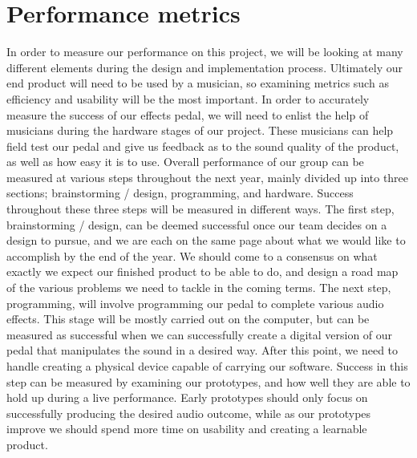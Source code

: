 \documentclass{article}
\begin{document}
\section{Performance metrics}
In order to measure our performance on this project, we will be looking at many different elements during the design and implementation process. Ultimately our end product will need to be used by a musician, so examining metrics such as efficiency and usability will be the most important. In order to accurately measure the success of our effects pedal, we will need to enlist the help of musicians during the hardware stages of our project. These musicians can help field test our pedal and give us feedback as to the sound quality of the product, as well as how easy it is to use. Overall performance of our group can be measured at various steps throughout the next year, mainly divided up into three sections; brainstorming / design, programming, and hardware. Success throughout these three steps will be measured in different ways. The first step, brainstorming / design, can be deemed successful once our team decides on a design to pursue, and we are each on the same page about what we would like to accomplish by the end of the year. We should come to a consensus on what exactly we expect our finished product to be able to do, and design a road map of the various problems we need to tackle in the coming terms. The next step, programming, will involve programming our pedal to complete various audio effects. This stage will be mostly carried out on the computer, but can be measured as successful when we can successfully create a digital version of our pedal that manipulates the sound in a desired way. After this point, we need to handle creating a physical device capable of carrying our software. Success in this step can be measured by examining our prototypes, and how well they are able to hold up during a live performance. Early prototypes should only focus on successfully producing the desired audio outcome, while as our prototypes improve we should spend more time on usability and creating a learnable product. 
\end{document}
